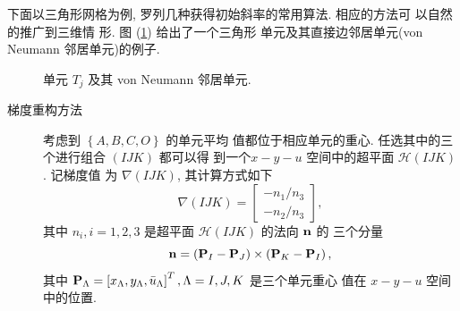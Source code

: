下面以三角形网格为例, 罗列几种获得初始斜率的常用算法. 相应的方法可
以自然的推广到三维情
形. 图 (\ref{fig:triangle-arbitrary-neighbour}) 给出了一个三角形
单元及其直接边邻居单元(von Neumann 邻居单元)的例子.
\begin{figure}[htbp]
  \centering
  
  \caption{单元 $T_{j}$ 及其 von Neumann 邻居单元.}
  \label{fig:triangle-arbitrary-neighbour}
\end{figure}
\begin{description}
\item[梯度重构方法]考虑到 $\left\{ A, B, C, O \right\}$ 的单元平均
  值都位于相应单元的重心. 任选其中的三个进行组合 $(IJK)$ 都可以得
  到一个$x-y-u$ 空间中的超平面 $\mathcal{H}(IJK)$. 记梯度值
  为 $\nabla(IJK)$, 其计算方式如下
  \begin{equation}
    \label{eq:gradiant-method}
    \nabla \left( IJK \right) = \left[
      \begin{array}{c}
        - {n_{1}}/{n_{3}}\\
        - {n_{2}}/{n_{3}}
      \end{array}
    \right],
  \end{equation}
  其中 $n_{i}, i=1,2,3$ 是超平面 $\mathcal{H}(IJK)$ 的法向 ${\bf{n}}$ 的
  三个分量
  \begin{equation}
    \label{eq:normal-to-the-plane}
    {\bf{n}} = \left( {\bf{P}}_{I} - {\bf{P}}_{J} \right)
    \times \left( {\bf{P}}_{K} - {\bf{P}}_{I} \right),
  \end{equation}
  其中 ${\bf{P}}_{\Lambda} = \left[ x_{\Lambda}, y_{\Lambda},
    \bar{u}_{\Lambda} \right]^{T}, \Lambda = I,J,K$ 是三个单元重心
  值在 $x-y-u$ 空间中的位置.


\end{description}
